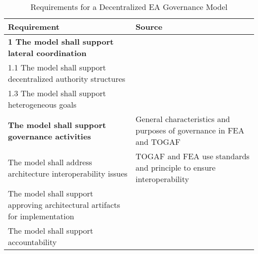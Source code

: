 \begin{table}
\caption{Requirements for a Decentralized EA Governance Model}
\label{table:requirements}
\begin{tabular}{ | p{} | p{} |}
%
\hline
%
\textbf{Requirement} & 
\textbf{Source}  \\
%
\hline
%
\textbf{1 The model shall support lateral coordination} & \\
%
%
1.1 The model shall support decentralized authority structures & 
\cite{Weill2004,pearlson2009,robbins1997,Camarinha-Matos2005} \\
%
%
%
1.3 The model shall support heterogeneous goals & 
\cite{Camarinha-Matos2005} \\
%
%
%
\hline
%
\textbf{The model shall support governance activities}  & 
General characteristics and purposes of governance in FEA \cite[Sec. 2]{FEA_PMO2007} and TOGAF \cite[Ch. 50]{togaf9.1} \\
%
%
The model shall address architecture interoperability issues  & 
TOGAF and FEA use standards and principle to ensure interoperability \\
%
%
%
The model shall support approving architectural artifacts for implementation  & 
 \\
%
%
%
The model shall support accountability & 
 \\
%
\hline
%
\end{tabular}
\end{table}

%
%

